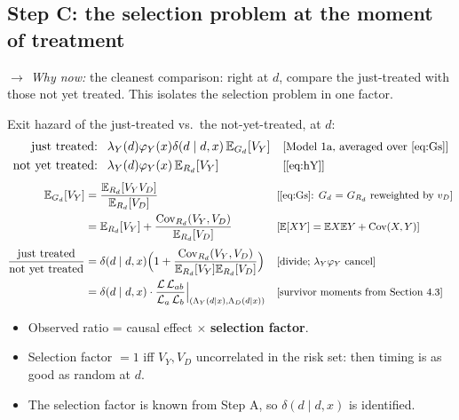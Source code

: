 \documentclass[11pt]{article}
\newcommand{\E}{\mathbb{E}}
\newcommand{\1}{\mathbf{1}}
\newcommand{\Lap}{\mathcal{L}}
\newcommand{\cov}{\operatorname{Cov}}
\newcommand{\why}[1]{\text{\small[#1]}}
\newcommand{\whynow}[1]{\par\noindent\textit{$\rightarrow$ Why now:} #1\par}
\begin{document}
\subsection{Step C: the selection problem at the moment of treatment}
\whynow{the cleanest comparison: right at $d$, compare the just-treated with those not yet treated. This isolates the selection problem in one factor.}
Exit hazard of the just-treated vs.\ the not-yet-treated, at $d$:
\begin{align}
  \text{just treated: } &\ \lambda_Y(d)\varphi_Y(x)\delta(d\mid d,x)\,\E_{G_d}[V_Y] && \why{Model 1a, averaged over \eqref{eq:Gs}} \nonumber\\
  \text{not yet treated: } &\ \lambda_Y(d)\varphi_Y(x)\,\E_{R_d}[V_Y] && \why{\eqref{eq:hY}} \nonumber
\end{align}
\begin{align}
  \E_{G_d}[V_Y] &= \frac{\E_{R_d}[V_YV_D]}{\E_{R_d}[V_D]} && \why{\eqref{eq:Gs}: $G_d$ = $G_{R_d}$ reweighted by $v_D$} \nonumber\\
  &= \E_{R_d}[V_Y]+\frac{\cov_{R_d}(V_Y,V_D)}{\E_{R_d}[V_D]} && \why{$\E[XY]=\E X\E Y+\cov(X,Y)$} \nonumber\\[3pt]
  \frac{\text{just treated}}{\text{not yet treated}} &= \delta(d\mid d,x)\Big(1+\frac{\cov_{R_d}(V_Y,V_D)}{\E_{R_d}[V_Y]\E_{R_d}[V_D]}\Big) && \why{divide; $\lambda_Y\varphi_Y$ cancel} \nonumber\\
  &= \delta(d\mid d,x)\cdot\frac{\Lap\,\Lap_{ab}}{\Lap_a\,\Lap_b}\Big|_{(\Lambda_Y(d\mid x),\Lambda_D(d\mid x))} && \why{survivor moments from Section 4.3} \nonumber
\end{align}
\begin{itemize}
  \item Observed ratio = causal effect $\times$ \textbf{selection factor}.
  \item Selection factor $=1$ iff $V_Y,V_D$ uncorrelated in the risk set: then timing is as good as random at $d$.
  \item The selection factor is known from Step A, so $\delta(d\mid d,x)$ is identified.
\end{itemize}
\end{document}
